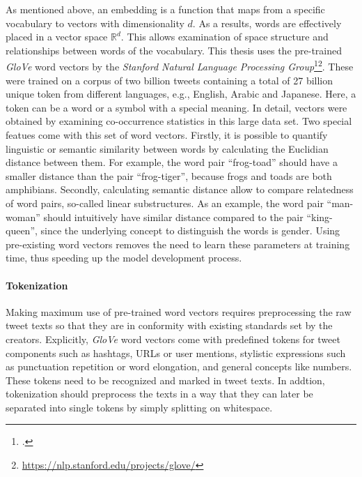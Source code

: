 As mentioned above, an embedding is a function that maps from a specific
vocabulary to vectors with dimensionality $d$.
As a results, words are effectively placed in a vector space $\mathbb{R}^d$.
This allows examination of space structure and relationships between words of 
the vocabulary.
This thesis uses the pre-trained \textit{GloVe} word vectors by the \textit{Stanford
Natural Language Processing Group}\footcite{Pennington2014}\footnote{\url{https://nlp.stanford.edu/projects/glove/}}.
These were trained on a corpus of two billion tweets containing a total of
27 billion unique token from different languages, e.g., English, Arabic and
Japanese.
Here, a token can be a word or a symbol with a special meaning.
In detail, vectors were obtained by examining co-occurrence statistics in this
large data set.
Two special featues come with this set of word vectors.
Firstly, it is possible to quantify linguistic or semantic similarity between
words by calculating the Euclidian distance between them.
For example, the word pair ``frog-toad'' should have a smaller distance than
the pair ``frog-tiger'', because frogs and toads are both amphibians.
Secondly, calculating semantic distance allow to compare relatedness of word
pairs, so-called linear substructures.
As an example, the word pair ``man-woman'' should intuitively have similar distance
compared to the pair ``king-queen'', since the underlying concept to distinguish
the words is gender.
Using pre-existing word vectors removes the need to learn these parameters
at training time, thus speeding up the model development process.

\paragraph{Tokenization}
\label{sub:tokenization}

Making maximum use of pre-trained word vectors requires preprocessing the raw
tweet texts so that they are in conformity with existing standards set by
the creators.
Explicitly, \textit{GloVe} word vectors come with predefined tokens for tweet
components such as hashtags, URLs or user mentions, stylistic expressions such
as punctuation repetition or word elongation, and general concepts like numbers.
These tokens need to be recognized and marked in tweet texts.
In addtion, tokenization should preprocess the texts in a way that they can
later be separated into single tokens by simply splitting on whitespace.

